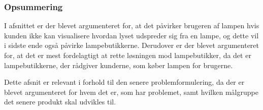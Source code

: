 





\subsubsection*{Opsummering}
I afsnittet er der blevet argumenteret for, at det påvirker brugeren af lampen hvis kunden ikke kan visualisere hvordan lyset udspreder sig fra en lampe, og dette vil i sidste ende også påvirke lampebutikkerne. Derudover er der blevet argumenteret for, at det er mest fordelagtigt at rette løsningen mod lampebutikker, da det er lampebutikkerne, der rådgiver kunderne, som køber lampen for brugerne.

Dette afsnit er relevant i forhold til den senere problemformulering, da der er blevet argumenteret for hvem det er, som har problemet, samt hvilken målgruppe det senere produkt skal udvikles til.
